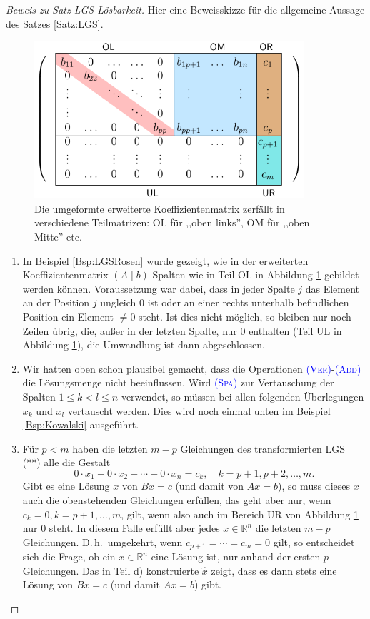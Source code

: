 \documentclass[a4paper,11pt,oneside]{article}
\theoremstyle{definition}
\def\OP#1{\textcolor{blue}{(\textnormal{\textrm{\textsc{#1}})}}}
\begin{document}
\begin{proof}[Beweis zu Satz LGS-Lösbarkeit]
Hier eine Beweisskizze für die allgemeine Aussage des Satzes \ref{Satz:LGS}.

\begin{figure}[ht]
\begin{center}
\includegraphics[width=10cm]{LGSDiaMatrix_farb.pdf}
\end{center}
\caption{Die umgeformte erweiterte Koeffizientenmatrix zerfällt in verschiedene Teilmatrizen: \textsf{OL} für ,,oben links'', \textsf{OM} für ,,oben Mitte'' etc.}
\label{fig:LGSDiaMatrix}
\end{figure}

\begin{enumerate}
\item
In Beispiel \ref{Bsp:LGSRosen} wurde gezeigt, wie in der erweiterten Koeffizientenmatrix $(A\mid b)$ Spalten wie in Teil \textsf{OL} in Abbildung \ref{fig:LGSDiaMatrix} gebildet werden können. Voraussetzung war dabei, dass in jeder Spalte $j$ das Element an der Position $j$ ungleich $0$ ist oder an einer rechts unterhalb befindlichen Position ein Element $\neq0$ steht. Ist dies nicht möglich, so bleiben nur noch Zeilen übrig, die, außer in der letzten Spalte, nur $0$ enthalten (Teil \textsf{UL} in Abbildung \ref{fig:LGSDiaMatrix}), die Umwandlung ist dann abgeschlossen.
\item
Wir hatten oben schon plausibel gemacht, dass die Operationen \OP{Ver}-\OP{Add} die Lösungsmenge nicht beeinflussen. Wird \OP{Spa} zur Vertauschung der Spalten $1\le k<l\le n$ verwendet, so müssen bei allen folgenden Überlegungen $x_k$ und $x_l$ vertauscht werden. Dies wird noch einmal unten im Beispiel \ref{Bsp:Kowalski} ausgeführt.
\item
Für $p<m$ haben die letzten $m-p$ Gleichungen des transformierten LGS (**) alle die Gestalt
$$
0\cdot x_1+0\cdot x_2+\cdots +0\cdot x_n = c_k, \quad k=p+1,p+2,\ldots, m.
$$
Gibt es eine Lösung $x$ von $Bx=c$ (und damit von $Ax=b$), so muss dieses $x$ auch die obenstehenden Gleichungen erfüllen, das geht aber nur, wenn $c_{k}=0,k=p+1,\ldots,m$, gilt, wenn also auch im Bereich \textsf{UR} von Abbildung \ref{fig:LGSDiaMatrix} nur $0$ steht. In diesem Falle erfüllt aber jedes $x\in\mathbb R^n$ die letzten $m-p$ Gleichungen. D.\,h.\ umgekehrt, wenn $c_{p+1}=\cdots=c_m=0$ gilt, so entscheidet sich die Frage, ob ein $x\in\mathbb R^n$ eine Lösung ist, nur anhand der ersten $p$ Gleichungen. Das in Teil d) konstruierte $\hat{x}$ zeigt, dass es dann stets eine Lösung von $Bx=c$ (und damit $ Ax=b$) gibt.


\end{enumerate}
\end{proof}
\end{document}

